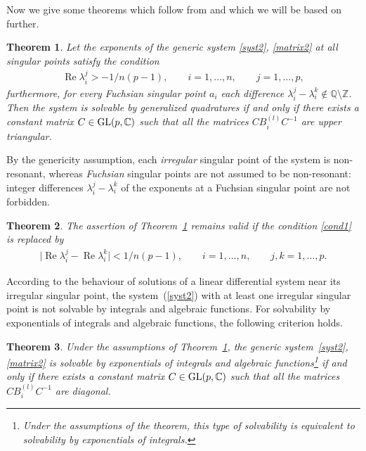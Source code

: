 \documentclass[pdftex]{sigma}
\numberwithin{equation}{section}
\newtheorem{Theorem}{Theorem}[section]
\begin{document}
Now we give some theorems which follow from \cite{Go, GV} and which we will be based on further.

\begin{Theorem}\label{theorem1}Let the exponents of the generic system \eqref{syst2}, \eqref{matrix2} at all singular points satisfy the condition
\begin{gather}\label{cond1}
\operatorname{Re}\lambda_i^j>-1/n(p-1), \qquad i=1,\ldots,n, \qquad j=1,\ldots,p,
\end{gather}
furthermore, for every Fuchsian singular point $a_i$ each difference $\lambda_i^j-\lambda_i^k\not\in{\mathbb Q} \setminus{\mathbb Z}$. Then the system is solvable by generalized quadratures if and only if there exists a constant matrix $C\in{\rm GL}(p,\mathbb C)$ such that all the matrices $CB_i^{(l)}C^{-1}$ are upper triangular.
\end{Theorem}

\begin{Remark} By the genericity assumption, each {\it irregular} singular point of the system is non-resonant, whereas
{\it Fuchsian} singular points are not assumed to be non-resonant: integer differences $\lambda_i^j-\lambda_i^k$ of the
exponents at a Fuchsian singular point are not forbidden.
\end{Remark}

\begin{Theorem}\label{theorem1'}
The assertion of Theorem~{\rm \ref{theorem1}} remains valid if the condition \eqref{cond1} is replaced by
\begin{gather*}%
\bigl|\operatorname{Re}\lambda_i^j-\operatorname{Re}\lambda_i^k\bigr|<1/n(p-1), \qquad i=1,\ldots,n, \qquad j,k=1,\ldots,p.
\end{gather*}
\end{Theorem}

According to the behaviour of solutions of a linear differential system near its irregular singular point, the system~(\ref{syst2}) with at least one irregular singular point is not solvable by integrals and algebraic functions.
For solvability by exponentials of integrals and algebraic functions, the following criterion holds.

\begin{Theorem}\label{theorem2}
Under the assumptions of Theorem~{\rm \ref{theorem1}}, the generic system~\eqref{syst2}, \eqref{matrix2} is solvable by exponentials of integrals and algebraic functions\footnote{Under the assumptions of the theorem, this type of solvability is equivalent to solvability by exponentials of integrals.} if and only if there exists a constant matrix $C\in{\rm GL}(p,\mathbb C)$ such that all the matrices $CB_i^{(l)}C^{-1}$ are diagonal.
\end{Theorem}
\end{document}
